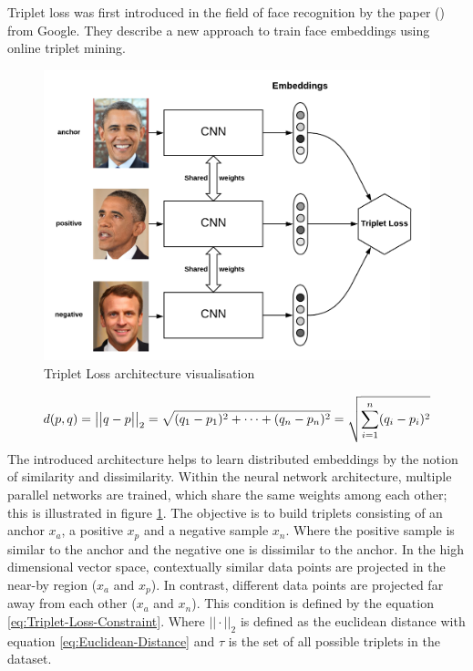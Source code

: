 Triplet loss was first introduced in the field of face recognition by the paper (\cite{schroff_facenet_2015}) from Google. They describe a new approach to train face embeddings using online triplet mining.
\begin{figure}[htbp]
	\centering
	\includegraphics[scale=0.35]{baa-documentation/img/Triplet_Loss_Architecture.png}
	\caption[Triplet Loss architecture visualisation]{Triplet Loss architecture visualisation \footnotemark}
	\label{fig:Triplet-Loss-Architecture}
\end{figure}
\noindent
{}
\begin{equation}
    \centering
    \begin{gathered}
        d(p,q) = \big|\big|q-p\big|\big|_2 = \sqrt{(q_1 - p_1)^2 + \dots + (q_n - p_n)^2} = \sqrt{\sum_{i=1}^n (q_i - p_i)^2}
    \end{gathered}
    \label{eq:Euclidean-Distance}
\end{equation}
\noindent
The introduced architecture helps to learn distributed embeddings by the notion of similarity and dissimilarity. Within the neural network architecture, multiple parallel networks are trained, which share the same weights among each other; this is illustrated in figure \ref{fig:Triplet-Loss-Architecture}. The objective is to build triplets consisting of an anchor $x_a$, a positive $x_p$ and a negative sample $x_n$. Where the positive sample is similar to the anchor and the negative one is dissimilar to the anchor. In the high dimensional vector space, contextually similar data points are projected in the near-by region ($x_a$ and $x_p$). In contrast, different data points are projected far away from each other ($x_a$ and $x_n$). This condition is defined by the equation \ref{eq:Triplet-Loss-Constraint}. Where $|| \cdot ||_2$ is defined as the euclidean distance with equation \ref{eq:Euclidean-Distance} and $\tau$ is the set of all possible triplets in the dataset.
